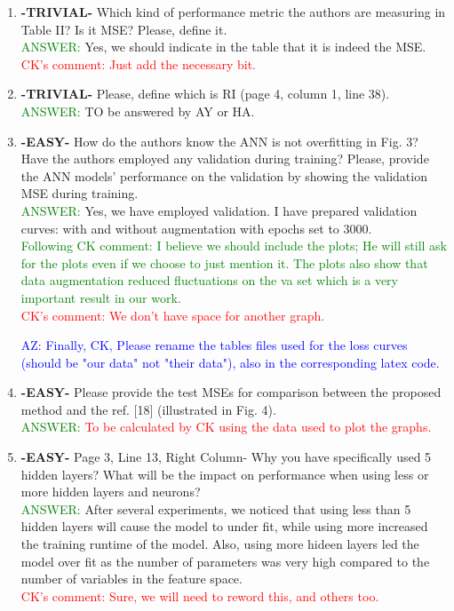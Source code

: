 \documentclass{article}
\begin{document}
\begin{enumerate}
\item \textbf{-TRIVIAL-} Which kind of performance metric the authors are measuring in Table II? Is it MSE? Please, define it.  \\
\textcolor{green}{ANSWER: } Yes, we should indicate in the table that it is indeed the MSE. \textcolor{red}{ CK's comment: Just add the necessary bit.}

\item \textbf{-TRIVIAL-} Please, define which is RI (page 4, column 1, line 38). \\
\textcolor{green}{ANSWER: } TO be answered by AY or HA.

\item  \textbf{-EASY-} How do the authors know the ANN is not overfitting in Fig. 3? Have the authors employed any validation during training? Please, provide the ANN models' performance on the validation by showing the validation MSE during training. \\
\textcolor{green}{ANSWER: } Yes, we have employed validation. I have prepared validation curves: with and without augmentation with epochs set to 3000.\\ \textcolor{green}{ Following CK comment: I believe we should include the plots; He will still ask for the plots even if we choose to just mention it. The plots also show that data augmentation reduced fluctuations on the va set which is a very important result in our work.} \\ \textcolor{red}{CK's comment: We don't have space for another graph.}

\textcolor{blue}{AZ: Finally, CK, Please rename the tables files used for the loss curves (should be "our data" not "their data"), also in the corresponding latex code.}

\item \textbf{-EASY-} Please provide the test MSEs for comparison between the proposed method and the ref. [18] (illustrated in Fig. 4).   \\
\textcolor{green}{ANSWER: }  \textcolor{red}{To be calculated by CK using the data used to plot the graphs.}
    
    \item \textbf{-EASY-} Page 3, Line 13, Right Column- Why you have specifically used 5 hidden layers? What will be the impact on performance when using less or more hidden layers and neurons?\\
    \textcolor{green}{ANSWER: } After several experiments, we noticed that using less than 5 hidden layers will cause the model to under fit, while using more increased the training runtime of the model. Also, using more hideen layers led the model over fit as the number of parameters was very high compared to the number of variables in the feature space.  \\ \textcolor{red}{ CK's comment: Sure, we will need to reword this, and others too.}


\end{enumerate}
\end{document}
